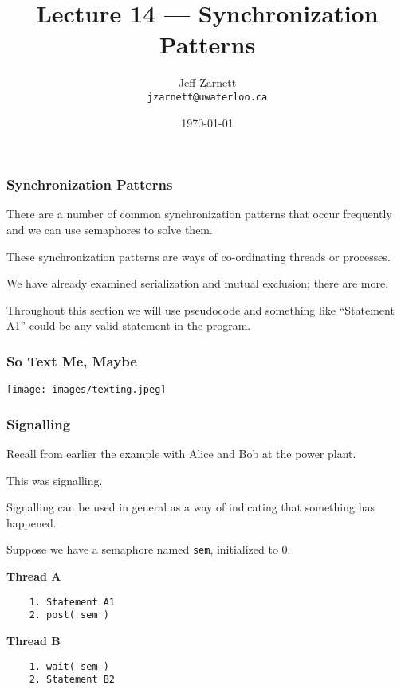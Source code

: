 

\title{Lecture 14 --- Synchronization Patterns }

\author{Jeff Zarnett \\ \small \texttt{jzarnett@uwaterloo.ca}}
\date{\today}




\begin{frame}
	\titlepage

\end{frame}

\begin{frame}
	\frametitle{Synchronization Patterns}


	There are a number of common synchronization patterns that occur frequently and we can use semaphores to solve them.

	These synchronization patterns are ways of co-ordinating threads or processes.

	We have already examined serialization and mutual exclusion; there are more.

	Throughout this section we will use pseudocode and something like ``Statement A1'' could be any valid statement in the program.

\end{frame}


\begin{frame}
	\frametitle{So Text Me, Maybe}

	\begin{center}
		\texttt{[image: images/texting.jpeg]}
	\end{center}


\end{frame}


\begin{frame}[fragile]
	\frametitle{Signalling}

	Recall from earlier the example with Alice and Bob at the power plant.

	This was signalling.

	Signalling can be used in general as a way of indicating that something has happened.

	Suppose we have a semaphore named \texttt{sem}, initialized to 0.

	\begin{multicols}{2}
		\textbf{Thread A}
		\begin{verbatim}
	1. Statement A1
	2. post( sem )
  \end{verbatim}
		\columnbreak
		\textbf{Thread B}
		\begin{verbatim}
	1. wait( sem )
	2. Statement B2
  \end{verbatim}
	\end{multicols}
	\vspace{-2em}


\end{frame}

